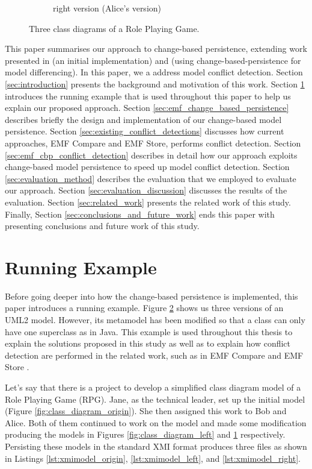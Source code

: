 \begin{figure}[t]
\begin{subfigure}[t]{0.31\linewidth}
    \caption{right version (Alice's version)}
    \label{fig:class_diagram_right}
  \end{subfigure}
  \caption{Three class diagrams of a Role Playing Game.}
  \label{fig:class_diagram_rpg}
\end{figure}

This paper summarises our approach to change-based persistence, extending work presented in \cite{DBLP:conf/models/YohannisKP17} (an initial implementation) and \cite{yohannis2019efficient} (using change-based-persistence for model differencing). In this paper, we a address model conflict detection. Section \ref{sec:introduction} presents the background and motivation of this work. Section \ref{sec:running_example} introduces the running example that is used throughout this paper to help us explain our proposed approach. Section \ref{sec:emf_change_based_persistence} describes briefly the design and  implementation of our change-based model persistence.  
Section \ref{sec:existing_conflict_detections} discusses how current approaches, EMF Compare and EMF Store, performs conflict detection. Section \ref{sec:emf_cbp_conflict_detection} describes in detail how our approach exploits change-based model persistence to speed up model conflict detection. Section \ref{sec:evaluation_method} describes the evaluation that we employed to evaluate our approach. Section \ref{sec:evaluation_discussion} discusses the results of the evaluation. Section \ref{sec:related_work} presents the related work of this study. Finally, Section \ref{sec:conclusions_and_future_work} ends this paper with presenting conclusions and future work of this study.

\section{Running Example}
\label{sec:running_example}
Before going deeper into how the change-based persistence is implemented, this paper introduces a running example. Figure \ref{fig:class_diagram_rpg} shows us three versions of an UML2 model. However, its metamodel has been modified so that a class can only have one superclass as in Java. This example is used throughout this thesis to explain the solutions proposed in this study as well as to explain how conflict detection are performed in the related work, such as in EMF Compare \cite{emfcompare2018developer} and EMF Store \cite{emfstore2019what}. 

Let's say that there is a project to develop a simplified class diagram model of a Role Playing Game (RPG). Jane, as the technical leader, set up the initial model (Figure \ref{fig:class_diagram_origin}). She then assigned this work to Bob and Alice. Both of them continued to work on the model and made some modification producing the models in Figures \ref{fig:class_diagram_left} and \ref{fig:class_diagram_right} respectively. Persisting these models in the standard XMI \cite{omg2018xmi} format produces three files as shown in Listings \ref{lst:xmimodel_origin}, \ref{lst:xmimodel_left}, and \ref{lst:xmimodel_right}.

